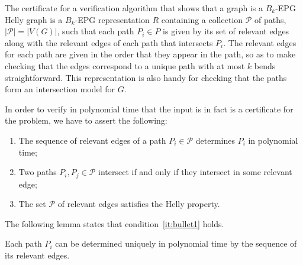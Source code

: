 \documentclass[runningheads]{llncs}
\begin{document}
The certificate for a verification algorithm  that shows that a graph is a $B_k$-EPG Helly graph is a  $B_k$-EPG representation $R$ containing a collection $\mathcal{P}$ of paths, $|\mathcal{P}| = |V(G)|$, such that  each path $P_i \in P$ is given by its set of relevant edges along with the relevant edges of each path that intersects $P_i$.  The relevant edges for each path are given in the order that they appear in the path, so as to make checking that the edges correspond to a unique path with at most $k$ bends straightforward.  This representation is also handy for checking that the paths form an intersection model for $G$.

In order to verify in polynomial time that the input is in fact is a certificate for the problem, we have to assert the following:

\begin{enumerate}[label=(\roman*)]
\item The sequence of relevant edges of a path $P_i\in \mathcal{P}$ determines $P_i$ in polynomial time; \label{it:bullet1}

\item Two paths $P_i, P_j \in \mathcal{P}$ intersect if and only if they intersect in some relevant edge; \label{it:bullet2}

\item The set $\mathcal{P}$ of relevant edges satisfies the Helly property.  \label{it:bullet3}
\end{enumerate}



The following lemma states that condition~\ref{it:bullet1} holds. 



\begin{lemma}\label{lem:verify1}
Each path $P_i$ can be determined uniquely in polynomial time by the sequence of its relevant edges.
\end{lemma}

\end{document}
